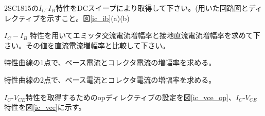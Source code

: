 \begin{description}
  \setlength{\parskip}{0cm} %
  \setlength{\itemsep}{0cm} %
  \item[課題3] 2SC1815の$I_C$-$I_B$特性をDCスイープにより取得して下さい。(用いた回路図とディレクティブを示すこと。図\ref{ic_ib}(a)(b)
  \item[任意課題5] $I_C-I_B$ 特性を用いてエミッタ交流電流増幅率と接地直流電流増幅率を求めて下さい。その値を直流電流増幅率と比較して下さい。
  \item[交流電流増幅率] 特性曲線の1点で、ベース電流とコレクタ電流の増幅率を求める。
  \item[直流電流増幅率] 特性曲線の2点で、ベース電流とコレクタ電流の増幅率を求める。
\end{description}
\vspace{-1\baselineskip}
$I_C$-$V_{CE}$特性を取得するためのopディレクティブの設定を図\ref{ic_vce_op}、$I_C$-$V_{CE}$特性を図\ref{ic_vce}に示す。
